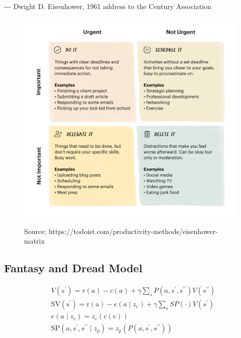 -\/-\/- Dwight D. Eisenhower, 1961 address to the Century Association

\begin{figure}

{\centering 

\href{https://todoist.com/productivity-methods/eisenhower-matrix}{\includegraphics[width=5.36in,height=\textheight]{images/eisenhower-matrix.png}}

}

\caption{Source:
https://todoist.com/productivity-methods/eisenhower-matrix}

\end{figure}

\hypertarget{app-fantasy-dread}{%
\subsection{Fantasy and Dread Model}\label{app-fantasy-dread}}

\[
\begin{aligned}
& V\left(s^{\prime}\right)=r(a)-c(a)+\gamma \sum_s P\left(a, s^{\prime}, s^{\prime \prime}\right) V\left(s^{\prime \prime}\right) \\
& \mathrm{SV}\left(\mathrm{s}^{\prime}\right)=\mathrm{r}(\mathrm{a})-e\left(a \mid z_e\right)+\gamma \sum_s S P(\cdot) V\left(s^{\prime}\right) \\
& e\left(a \mid z_e\right)=z_e(c(e)) \\
& \mathrm{SP}\left(a, s^{\prime}, s^{\prime \prime} \mid z_p\right)=z_p\left(P\left(a, s^{\prime}, s^{\prime \prime}\right)\right)
\end{aligned}
\]

